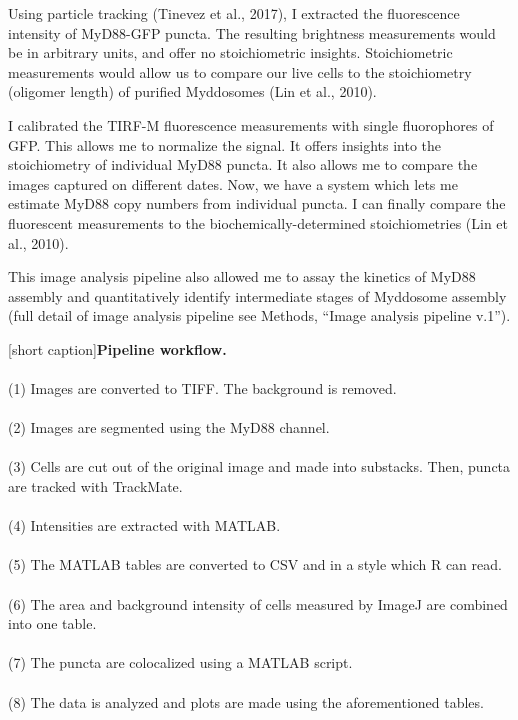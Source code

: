 Using particle tracking (Tinevez et al., 2017), I extracted the fluorescence intensity of MyD88-GFP puncta. The resulting brightness measurements would be in arbitrary units, and offer no stoichiometric insights. Stoichiometric measurements would allow us to compare our live cells to the stoichiometry (oligomer length) of purified Myddosomes (Lin et al., 2010).

I calibrated the TIRF-M fluorescence measurements with single fluorophores of GFP. This allows me to normalize the signal. It offers insights into the stoichiometry of individual MyD88 puncta. It also allows me to compare the images captured on different dates. Now, we have a system which lets me estimate MyD88 copy numbers from individual puncta. I can finally compare the fluorescent measurements to the biochemically-determined stoichiometries (Lin et al., 2010).

This image analysis pipeline also allowed me to assay the kinetics of MyD88 assembly and quantitatively identify intermediate stages of Myddosome assembly (full detail of image analysis pipeline see Methods, “Image analysis pipeline v.1”).


\begin{centering}

\captionsetup{parbox=none}
[short caption]{\textbf{Pipeline workflow.}
\\
\\
(1) Images are converted to TIFF. The background is removed.
\\
\\
(2) Images are segmented using the MyD88 channel.
\\
\\
(3) Cells are cut out of the original image and made into substacks. Then, puncta are tracked with TrackMate.
\\
\\
(4) Intensities are extracted with MATLAB.
\\
\\
(5) The MATLAB tables are converted to CSV and in a style which R can read.
\\
\\
(6) The area and background intensity of cells measured by ImageJ are combined into one table.
\\
\\
(7) The puncta are colocalized using a MATLAB script.
\\
\\
(8) The data is analyzed and plots are made using the aforementioned tables.}
\label{fig:p1M}
\end{centering}

